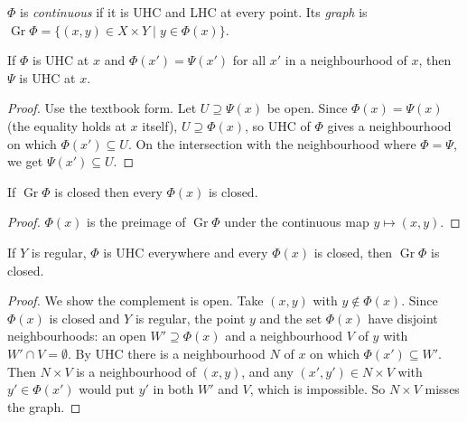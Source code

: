 \begin{definition}
\label{def:contCorr}
\leanok
{}
$\Phi$ is \emph{continuous} if it is UHC and LHC at every point. Its \emph{graph} is
$\operatorname{Gr}\Phi = \{(x, y) \in X \times Y \mid y \in \Phi(x)\}$.
\end{definition}

\begin{lemma}
\label{lem:uhc_congr}
\leanok
{}
If $\Phi$ is UHC at $x$ and $\Phi(x') = \Psi(x')$ for all $x'$ in a neighbourhood of $x$, then
$\Psi$ is UHC at $x$.
\end{lemma}
\begin{proof}
\leanok
Use the textbook form. Let $U \supseteq \Psi(x)$ be open. Since $\Phi(x) = \Psi(x)$ (the equality holds
at $x$ itself), $U \supseteq \Phi(x)$, so UHC of $\Phi$ gives a neighbourhood on which
$\Phi(x') \subseteq U$. On the intersection with the neighbourhood where $\Phi = \Psi$, we get
$\Psi(x') \subseteq U$.
\end{proof}

\begin{lemma}
\label{lem:closed_values}
\leanok
{}
If $\operatorname{Gr}\Phi$ is closed then every $\Phi(x)$ is closed.
\end{lemma}
\begin{proof}
\leanok
$\Phi(x)$ is the preimage of $\operatorname{Gr}\Phi$ under the continuous map $y \mapsto (x, y)$.
\end{proof}

\begin{theorem}
\label{thm:closed_graph_of_uhc}
\leanok
{}
If $Y$ is regular, $\Phi$ is UHC everywhere and every $\Phi(x)$ is closed, then
$\operatorname{Gr}\Phi$ is closed.
\end{theorem}
\begin{proof}
\leanok
We show the complement is open. Take $(x, y)$ with $y \notin \Phi(x)$. Since $\Phi(x)$ is closed and
$Y$ is regular, the point $y$ and the set $\Phi(x)$ have disjoint neighbourhoods: an open
$W' \supseteq \Phi(x)$ and a neighbourhood $V$ of $y$ with $W' \cap V = \emptyset$. By UHC there is a
neighbourhood $N$ of $x$ on which $\Phi(x') \subseteq W'$. Then $N \times V$ is a neighbourhood of
$(x, y)$, and any $(x', y') \in N \times V$ with $y' \in \Phi(x')$ would put $y'$ in both $W'$ and $V$,
which is impossible. So $N \times V$ misses the graph.
\end{proof}

